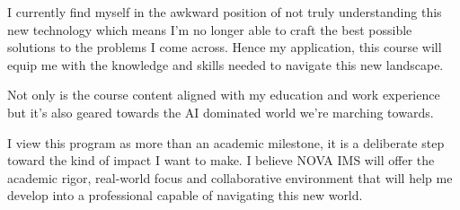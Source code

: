 \documentclass[11pt, a4paper]{awesome-cv}
\begin{document}
\begin{cvletter}
I currently find myself in the awkward position of not truly understanding this new technology which means I'm no longer able to craft the best possible solutions to the problems I come across. Hence my application, this course will equip me with the knowledge and skills needed to navigate this new landscape.

Not only is the course content aligned with my education and work experience but it's also geared towards the AI dominated world we're marching towards.

I view this program as more than an academic milestone, it is a deliberate step toward the kind of impact I want to make. I believe NOVA IMS will offer the academic rigor, real-world focus and collaborative environment that will help me develop into a professional capable of navigating this new world.

\end{cvletter}


\makeletterclosing
\end{document}
